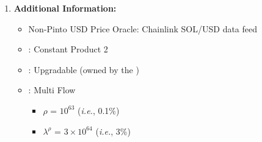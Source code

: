 \documentclass[class=article, crop=false]{standalone}
\begin{document}
\begin{enumerate}
    \item \textbf{Additional Information:}
        \begin{itemize}
            \item Non-Pinto USD Price Oracle: Chainlink SOL/USD data feed
            \item {}: Constant Product 2
            \item {}: Upgradable  (owned by the )
            \item {}: Multi Flow
                \begin{itemize}
                    \item $\rho$ = $10^{63}$ (\textit{i.e.}, 0.1\%)
                    \item $\lambda^{\rho}$ = $3 \times 10^{64}$ (\textit{i.e.}, 3\%)
                \end{itemize}
        \end{itemize}
    
\end{enumerate}
\end{document}
